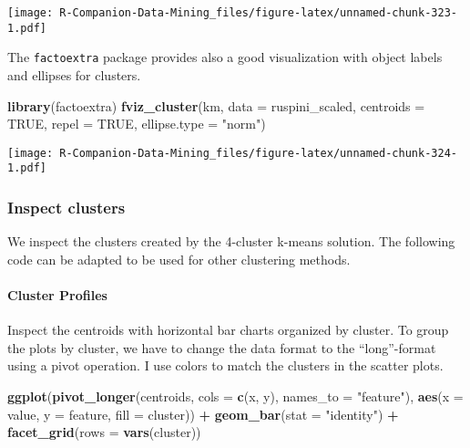 \documentclass[
  notitlepage]{book}
\newenvironment{Shaded}{\begin{snugshade}}{\end{snugshade}}
\newcommand{\DataTypeTok}[1]{\textcolor[rgb]{0.13,0.29,0.53}{#1}}
\newcommand{\KeywordTok}[1]{\textcolor[rgb]{0.13,0.29,0.53}{\textbf{#1}}}
\newcommand{\NormalTok}[1]{#1}
\newcommand{\OperatorTok}[1]{\textcolor[rgb]{0.81,0.36,0.00}{\textbf{#1}}}
\newcommand{\OtherTok}[1]{\textcolor[rgb]{0.56,0.35,0.01}{#1}}
\newcommand{\StringTok}[1]{\textcolor[rgb]{0.31,0.60,0.02}{#1}}
\begin{document}
\texttt{[image: R-Companion-Data-Mining\_files/figure-latex/unnamed-chunk-323-1.pdf]}

The \texttt{factoextra} package provides also a good visualization with object labels
and ellipses for clusters.

\begin{Shaded}
\begin{Highlighting}[]
\KeywordTok{library}\NormalTok{(factoextra)}
\KeywordTok{fviz\_cluster}\NormalTok{(km, }\DataTypeTok{data =}\NormalTok{ ruspini\_scaled, }\DataTypeTok{centroids =} \OtherTok{TRUE}\NormalTok{, }
             \DataTypeTok{repel =} \OtherTok{TRUE}\NormalTok{, }\DataTypeTok{ellipse.type =} \StringTok{"norm"}\NormalTok{)}
\end{Highlighting}
\end{Shaded}

\texttt{[image: R-Companion-Data-Mining\_files/figure-latex/unnamed-chunk-324-1.pdf]}

\hypertarget{inspect-clusters}{%
\subsubsection{Inspect clusters}\label{inspect-clusters}}

We inspect the clusters created by the 4-cluster k-means solution. The
following code can be adapted to be used for other clustering methods.

\hypertarget{cluster-profiles}{%
\paragraph{Cluster Profiles}\label{cluster-profiles}}

Inspect the centroids with horizontal bar charts organized by cluster.
To group the plots by cluster, we have to change the data format to the
``long''-format using a pivot operation. I use colors to match the
clusters in the scatter plots.

\begin{Shaded}
\begin{Highlighting}[]
\KeywordTok{ggplot}\NormalTok{(}\KeywordTok{pivot\_longer}\NormalTok{(centroids, }
                    \DataTypeTok{cols =} \KeywordTok{c}\NormalTok{(x, y), }
                    \DataTypeTok{names\_to =} \StringTok{"feature"}\NormalTok{),}
  \KeywordTok{aes}\NormalTok{(}\DataTypeTok{x =}\NormalTok{ value, }\DataTypeTok{y =}\NormalTok{ feature, }\DataTypeTok{fill =}\NormalTok{ cluster)) }\OperatorTok{+}
\StringTok{  }\KeywordTok{geom\_bar}\NormalTok{(}\DataTypeTok{stat =} \StringTok{"identity"}\NormalTok{) }\OperatorTok{+}
\StringTok{  }\KeywordTok{facet\_grid}\NormalTok{(}\DataTypeTok{rows =} \KeywordTok{vars}\NormalTok{(cluster))}
\end{Highlighting}
\end{Shaded}
\end{document}
